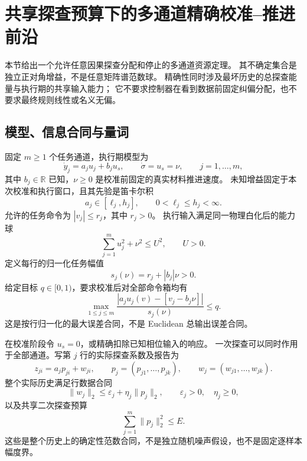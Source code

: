 \documentclass[11pt,a4paper]{article}
\numberwithin{equation}{section}
\theoremstyle{definition}
\begin{document}
\section{共享探查预算下的多通道精确校准--推进前沿}
\label{v44m:sec:multichannel}

本节给出一个允许任意因果探查分配和停止的多通道资源定理。
其不确定集合是独立正对角增益，不是任意矩阵谱范数球。
精确性同时涉及最坏历史的总探查能量与执行期的共享输入能力；
它不要求控制器在看到数据前固定纠偏分配，也不要求最终规则线性或名义无偏。

\subsection{模型、信息合同与量词}

固定 $m\ge1$ 个任务通道，执行期模型为
\begin{equation}
 \dot y_j=a_j u_j+b_j u_s,\qquad
 \dot\sigma=u_s=\nu,\qquad j=1,\ldots,m,
 \label{v44m:eq:plant}
\end{equation}
其中 $b_j\in\mathbb R$ 已知，$\nu\ge0$ 是校准前固定的真实材料推进速度。
未知增益固定于本次校准和执行窗口，且其先验是笛卡尔积
\begin{equation}
 a_j\in[\ell_j,h_j],\qquad 0<\ell_j\le h_j<\infty.
 \label{v44m:eq:prior}
\end{equation}
允许的任务命令为 $|v_j|\le r_j$，其中 $r_j>0$。
执行输入满足同一物理白化后的能力球
\begin{equation}
 \sum_{j=1}^m u_j^2+\nu^2\le U^2,
 \qquad U>0.
 \label{v44m:eq:execution-cap}
\end{equation}
定义每行的归一化任务幅值
\begin{equation}
 s_j(\nu)=r_j+|b_j|\nu>0.
\end{equation}
给定目标 $q\in[0,1)$，要求校准后对全部命令箱均有
\begin{equation}
 \max_{1\le j\le m}
 \frac{|a_j u_j(v)-[v_j-b_j\nu]|}{s_j(\nu)}\le q.
 \label{v44m:eq:rowbox-objective}
\end{equation}
这是按行归一化的最大误差合同，不是 Euclidean 总输出误差合同。

在校准阶段令 $u_s=0$，或精确扣除已知相位输入的响应。
一次探查可以同时作用于全部通道。写第 $j$ 行的实际探查系数及报告为
\begin{equation}
 z_{ji}=a_j p_{ji}+w_{ji},\qquad
 p_j=(p_{j1},\ldots,p_{jk}),\qquad
 w_j=(w_{j1},\ldots,w_{jk}).
 \label{v44m:eq:calibration-oracle}
\end{equation}
整个实际历史满足行数据合同
\begin{equation}
 \|w_j\|_2\le\varepsilon_j+\eta_j\|p_j\|_2,
 \qquad \varepsilon_j>0,\quad \eta_j\ge0,
 \label{v44m:eq:row-noise}
\end{equation}
以及共享二次探查预算
\begin{equation}
 \sum_{j=1}^m\|p_j\|_2^2\le E.
 \label{v44m:eq:shared-energy}
\end{equation}
这些是整个历史上的确定性范数合同，不是独立随机噪声假设，也不是固定逐样本幅度界。
\end{document}

